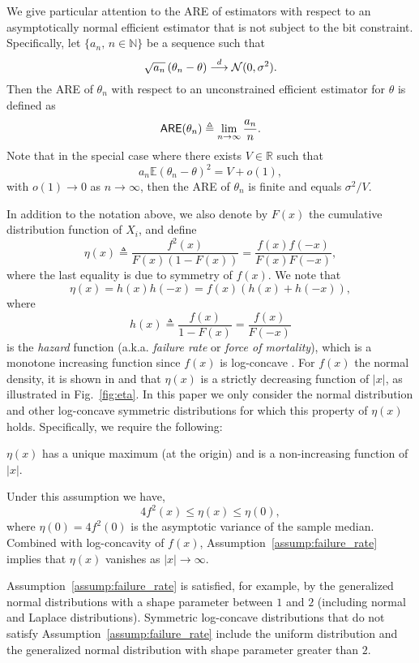 We give particular attention to the ARE of estimators with respect to an asymptotically normal efficient estimator that is not subject to the bit constraint. Specifically, let $\{a_n,\,n\in \mathbb N\}$ be a sequence such that 
\[
\sqrt{a_n}\left({\theta}_n - \theta\right) \overset{d}{\longrightarrow} \mathcal{N}(0, \sigma^2).
\]
Then the ARE of ${\theta}_n$ with respect to an unconstrained efficient estimator for $\theta$ is defined as \cite[Def. 6.6.6]{lehmann2006theory}
\[
\mathsf{ARE}({\theta}_n) \triangleq
\lim_{n\rightarrow \infty} \frac{a_n}{n}. 
\]
Note that in the special case where there exists $V \in \mathbb R$ such that
\[
a_n \mathbb E \left({\theta}_n - \theta \right)^2 = V + o(1),
\]
with $o(1)\to 0$ as $n\to \infty$, then the ARE of ${\theta}_n$ is finite and equals $\sigma^2/V$. \par

In addition to the notation above, we also denote by $F(x)$ the cumulative distribution function of $X_i$, and define
\begin{equation} \label{eq:eta_def}
\eta(x) \triangleq \frac{f^2(x)}{F(x)(1-F(x))} =  \frac{f(x)f(-x)}{F(x)F(-x)}, 
\end{equation}
where the last equality is due to symmetry of $f(x)$. We note that 
\begin{equation}
\label{eq:eta_h}
\eta(x) = h(x)h(-x) = f(x) \left( h(x) + h(-x) \right), 
\end{equation}
where 
\[
h(x) \triangleq \frac{f(x)}{1-F(x)} = \frac{f(x)}{F(-x)}
\]
is the \emph{hazard} function (a.k.a. \emph{failure rate} or \emph{force of mortality}), which is a monotone increasing function since $f(x)$ is log-concave \cite{bagnoli2005log}. 
%
For $f(x)$ the normal density, it is shown in \cite{Samford1953} and \cite{hammersley1950estimating} that $\eta(x)$ is a strictly decreasing function of $|x|$, as illustrated in Fig.~\ref{fig:eta}. 
%
In this paper we only consider the normal distribution and other log-concave symmetric distributions for which this property of $\eta(x)$ holds. Specifically, we require the following:
\begin{assump} \label{assump:failure_rate}
 $\eta(x)$ has a unique maximum (at the origin) and is a non-increasing function of $|x|$. 
\end{assump}
Under this assumption we have, 
\[
4f^2(x) \leq \eta(x) \leq \eta(0),
\] 
%
where $\eta(0) = 4 f^2(0)$ is the asymptotic variance of the sample median. Combined with log-concavity of $f(x)$, Assumption~\ref{assump:failure_rate} implies that $\eta(x)$ vanishes as $|x|\rightarrow \infty$. \par
%
Assumption~\ref{assump:failure_rate} is satisfied, for example, by the generalized normal distributions with a shape parameter between $1$ and $2$ (including normal and Laplace distributions). Symmetric log-concave distributions that do not satisfy Assumption~\ref{assump:failure_rate} include the uniform distribution and the generalized normal distribution with shape parameter greater than $2$.\par

